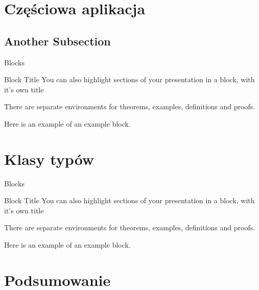 \documentclass{beamer}
\begin{document}
\section{Częściowa aplikacja}

\subsection{Another Subsection}

\begin{frame}{Blocks}
\begin{block}{Block Title}
You can also highlight sections of your presentation in a block, with it's own title
\end{block}
\begin{theorem}
There are separate environments for theorems, examples, definitions and proofs.
\end{theorem}
\begin{example}
Here is an example of an example block.
\end{example}
\end{frame}

\section{Klasy typów}

\begin{frame}{Blocks}
\begin{block}{Block Title}
You can also highlight sections of your presentation in a block, with it's own title
\end{block}
\begin{theorem}
There are separate environments for theorems, examples, definitions and proofs.
\end{theorem}
\begin{example}
Here is an example of an example block.
\end{example}
\end{frame}

\section*{Podsumowanie}
\end{document}
